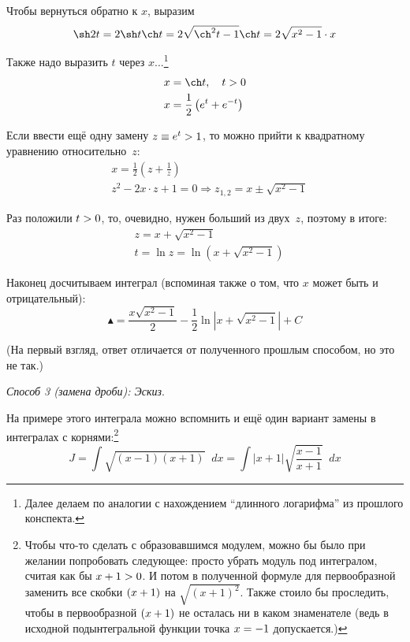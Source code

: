 \documentclass[a4paper,12pt]{article}
\newcommand{\diff}{\mathop{}\!d}
\begin{document}
\begin{example}
    Чтобы вернуться обратно к $x$, выразим
    \[
      \sh 2t = 2 \sh t \ch t = 2 \sqrt{\ch^2 t - 1} \ch t = 2 \sqrt{x^2 - 1} \cdot x
    \]

    Также надо выразить $t$ через $x$...\footnote{
      Далее делаем по аналогии с нахождением ``длинного логарифма'' из прошлого конспекта.
    }
    \[
      \begin{aligned}
        &x = \ch t,\quad t > 0\\
        &x = \frac{1}{2}\left(e^t + e^{-t}\right)  %
      \end{aligned}
    \]
    
    Если ввести ещё одну замену $z \hm\equiv e^t \hm> 1$, то можно прийти к квадратному уравнению относительно~$z$:
    \[
      \begin{aligned}
        &x = \frac{1}{2}\left(z + \frac{1}{z}\right)\\
        &z^2 -2x \cdot z + 1 = 0 \Rightarrow z_{1, 2} = x \pm \sqrt{x^2 - 1}
      \end{aligned}
    \]

    Раз положили $t \hm> 0$, то, очевидно, нужен больший из двух~$z$, поэтому в итоге:
    \[
      \begin{aligned}
        &z = x + \sqrt{x^2 - 1}\\
        &t = \ln z = \ln \left(x + \sqrt{x^2 - 1}\right)
      \end{aligned}
    \]

    Наконец досчитываем интеграл (вспоминая также о том, что $x$ может быть и отрицательный):
    \[
      \blacktriangle = \frac{x \sqrt{x^2 - 1}}{2} - \frac{1}{2} \ln \left|x + \sqrt{x^2 - 1}\right| + C
    \]

    (На первый взгляд, ответ отличается от полученного прошлым способом, но это не так.)

    \medskip

    \noindent
    \emph{Способ 3 (замена дроби): Эскиз}.

    На примере этого интеграла можно вспомнить и ещё один вариант замены в интегралах с корнями:\footnote{
      Чтобы что-то сделать с образовавшимся модулем, можно бы было при желании попробовать следующее: просто убрать модуль под интегралом, считая как бы $x \hm+ 1 \hm> 0$.
      И потом в полученной формуле для первообразной заменить все скобки $(x \hm+ 1)$ на $\sqrt{(x + 1)^2}$.
      Также стоило бы проследить, чтобы в первообразной $(x \hm+ 1)$ не осталась ни в каком знаменателе (ведь в исходной подынтегральной функции точка $x \hm= -1$ допускается.)
    }
    \[
      J = \int \sqrt{(x - 1)(x + 1)} \diff x = \int |x + 1| \sqrt{\frac{x - 1}{x + 1}} \diff x
    \]


\end{example}
\end{document}
